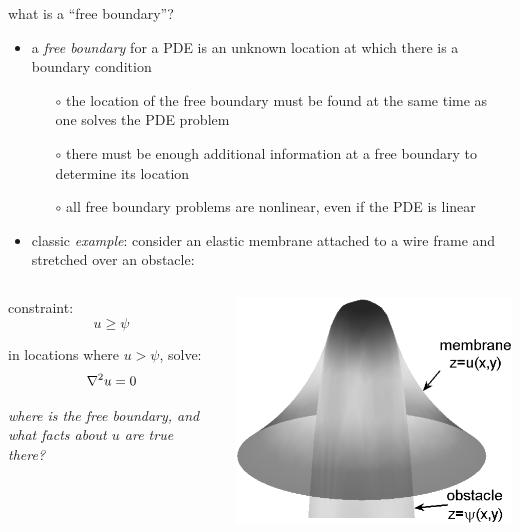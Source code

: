 \begin{frame}{what is a ``free boundary''?}

\begin{itemize}
\item a \emph{free boundary} for a PDE is an unknown location at which there is a boundary condition
  \begin{itemize}
  \item[$\circ$] the location of the free boundary must be found at the same time as one solves the PDE problem
  \item[$\circ$] there must be enough additional information at a free boundary to determine its location
  \item[$\circ$] all free boundary problems are nonlinear, even if the PDE is linear
  \end{itemize}
\item classic \emph{example}:  consider an elastic membrane attached to a wire frame and stretched over an obstacle:
\end{itemize}

\begin{columns}
\begin{column}{0.5\textwidth}
\small
constraint:
  $$u \ge \psi$$

in locations where $u>\psi$, solve:
  $$\nabla^2 u = 0$$
  
\emph{where is the free boundary, and what facts about $u$ are true there?}
\end{column}
\begin{column}{0.5\textwidth}
  \includegraphics[width=1.0\textwidth]{photos/classicalobs}
\end{column}
\end{columns}
\end{frame}


